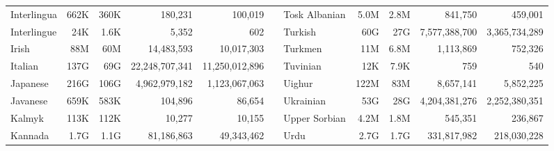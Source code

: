 \begin{table*}[t!]
\begin{tabular}{lrrrrclrrrr}
        Interlingua               & 662K                     & 360K                      & 180,231                  & 100,019                   &                          & Tosk Albanian             & 5.0M                     & 2.8M                      & 841,750                  & 459,001                   \\
        Interlingue               & 24K                      & 1.6K                      & 5,352                    & 602                       &                          & Turkish                   & 60G                      & 27G                       & 7,577,388,700            & 3,365,734,289             \\
        Irish                     & 88M                      & 60M                       & 14,483,593               & 10,017,303                &                          & Turkmen                   & 11M                      & 6.8M                      & 1,113,869                & 752,326                   \\
        Italian                   & 137G                     & 69G                       & 22,248,707,341           & 11,250,012,896            &                          & Tuvinian                  & 12K                      & 7.9K                      & 759                      & 540                       \\
        Japanese                  & 216G                     & 106G                      & 4,962,979,182            & 1,123,067,063             &                          & Uighur                    & 122M                     & 83M                       & 8,657,141                & 5,852,225                 \\
        Javanese                  & 659K                     & 583K                      & 104,896                  & 86,654                    &                          & Ukrainian                 & 53G                      & 28G                       & 4,204,381,276            & 2,252,380,351             \\
        Kalmyk                    & 113K                     & 112K                      & 10,277                   & 10,155                    &                          & Upper Sorbian             & 4.2M                     & 1.8M                      & 545,351                  & 236,867                   \\
        Kannada                   & 1.7G                     & 1.1G                      & 81,186,863               & 49,343,462                &                          & Urdu                      & 2.7G                     & 1.7G                      & 331,817,982              & 218,030,228               \\

\end{tabular}
\end{table*}
